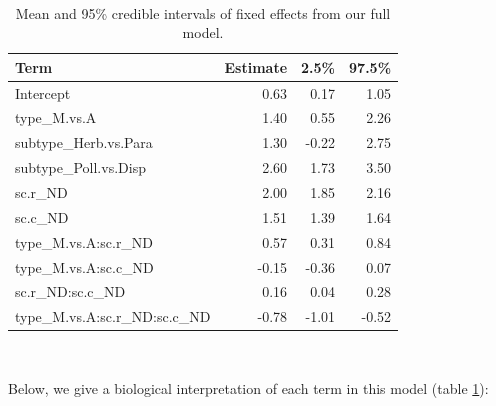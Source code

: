 \documentclass[11pt,]{article}
\begin{document}
~

\begin{table}[!h]

\caption{\label{tab:full-table}Mean and 95\% credible intervals of fixed effects from our full model.}
\centering
\begin{tabular}{lrrr}
\toprule
Term & Estimate & 2.5\% & 97.5\%\\
\midrule
\rowcolor{gray!6}  Intercept & 0.63 & 0.17 & 1.05\\
type\_M.vs.A & 1.40 & 0.55 & 2.26\\
\rowcolor{gray!6}  subtype\_Herb.vs.Para & 1.30 & -0.22 & 2.75\\
subtype\_Poll.vs.Disp & 2.60 & 1.73 & 3.50\\
\rowcolor{gray!6}  sc.r\_ND & 2.00 & 1.85 & 2.16\\
sc.c\_ND & 1.51 & 1.39 & 1.64\\
\rowcolor{gray!6}  type\_M.vs.A:sc.r\_ND & 0.57 & 0.31 & 0.84\\
type\_M.vs.A:sc.c\_ND & -0.15 & -0.36 & 0.07\\
\rowcolor{gray!6}  sc.r\_ND:sc.c\_ND & 0.16 & 0.04 & 0.28\\
type\_M.vs.A:sc.r\_ND:sc.c\_ND & -0.78 & -1.01 & -0.52\\
\bottomrule
\end{tabular}
\end{table}

~

Below, we give a biological interpretation of each term in this model
(table \ref{tab:full-table}):
\end{document}
